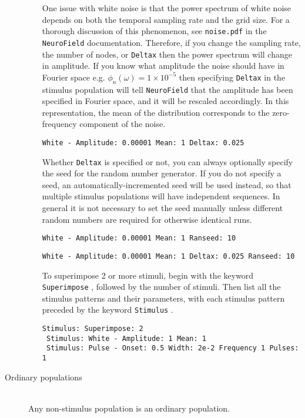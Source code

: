 \documentclass[12pt,a4paper]{article}
\newcommand{\type}[1]{ {\small\small\tt #1} }
\newcommand{\NF}[0]{ \type{NeuroField}}
\begin{document}
\begin{description}
\begin{itemize}
    One issue with white noise is that the power spectrum of white noise depends on both the temporal sampling rate and the grid size. For a thorough discussion of this phenomenon, see \type{noise.pdf} in the \NF documentation. Therefore, if you change the sampling rate, the number of nodes, or \type{Deltax} then the power spectrum will change in amplitude. If you know what amplitude the noise should have in Fourier space e.g. $\phi_n(\omega) = 1 \times 10^{-5}$ then specifying \type{Deltax} in the stimulus population will tell \NF that the amplitude has been specified in Fourier space, and it will be rescaled accordingly. In this representation, the mean of the distribution corresponds to the zero-frequency component of the noise. 
    
	\begin{lstlisting}
White - Amplitude: 0.00001 Mean: 1 Deltax: 0.025
	\end{lstlisting}
	
	Whether \type{Deltax} is specified or not, you can always optionally specify the seed for the random number generator. If you do not specify a seed, an automatically-incremented seed will be used instead, so that multiple stimulus populations will have independent sequences. In general it is not necessary to set the seed manually unless different random numbers are required for otherwise identical runs. 

	\begin{lstlisting}
White - Amplitude: 0.00001 Mean: 1 Ranseed: 10
	\end{lstlisting}
	\begin{lstlisting}
White - Amplitude: 0.00001 Mean: 1 Deltax: 0.025 Ranseed: 10
	\end{lstlisting}

	To superimpose 2 or more stimuli, begin with the keyword \type{Superimpose}, followed by the number of stimuli. Then list all the stimulus patterns and their parameters, with each stimulus pattern preceded by the keyword \type{Stimulus}.
	\begin{lstlisting}
Stimulus: Superimpose: 2
 Stimulus: White - Amplitude: 1 Mean: 1
 Stimulus: Pulse - Onset: 0.5 Width: 2e-2 Frequency 1 Pulses: 1
	\end{lstlisting}

	\end{itemize}
\item[Ordinary populations]\ \\
	Any non-stimulus population is an ordinary population.


\end{description}
\end{document}
